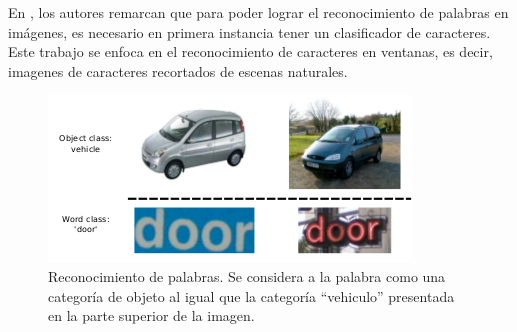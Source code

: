 	En \cite{wang}, los autores remarcan que para poder lograr el reconocimiento de palabras en imágenes, es necesario en primera instancia tener un clasificador de caracteres. Este trabajo se enfoca en el reconocimiento de caracteres en ventanas, es decir, imagenes de caracteres recortados de escenas naturales. 
	
	
	
	\begin{figure}[htbp]
		\centering
		\centerline{ \includegraphics[scale=0.7]{img/object_recognition.png} }
		\caption[Reconocimiento generico de objetos]{Reconocimiento de palabras. Se considera a la palabra como una categoría de objeto al igual que la categoría ``vehiculo'' presentada en la parte superior de la imagen.}
		\label{fig: Reconocimiento generico}
	\end{figure}
